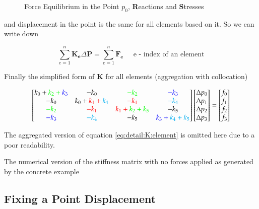 \begin{figure}[H]
\centering

\caption{Force Equilibrium in the Point $p_0$, \textbf{R}eactions and \textbf{S}tresses}
\label{fig:point0:forces}
\end{figure}

and displacement in the point is the same for all elements based on it. So we can write down

\begin{equation}
\sum\limits_{e=1}^n \mathbf{K_e} \Delta \mathbf{P} = \sum\limits_{e=1}^n \mathbf{F_e}\;\;\;\;\;\mbox{e - index of an element}
\end{equation}

Finally the simplified form of $\mathbf{K}$ for all elements (aggregation with collocation)

\begin{equation}
\begin{bmatrix}
	k_0 + \color{green}{k_2} + \color{blue}{k_3} & -k_0 & \color{green}{-k_2} & \color{blue}{-k_3} \\
	-k_0 & k_0 + \color{red}{k_1} + \color{cyan}{k_4} & \color{red}{-k_1} & \color{cyan}{-k_4} \\
	\color{green}{-k_2} & \color{red}{-k_1} & \color{red}{k_1} + \color{green}{k_2} + k_5 & -k_5 \\
	\color{blue}{-k_3} & \color{cyan}{-k_4} & -k_5 & \color{blue}{k_3} + \color{cyan}{k_4} + k_5
\end{bmatrix}
\begin{bmatrix}
	\Delta p_0 \\
	\Delta p_1 \\
	\Delta p_2 \\
	\Delta p_3
\end{bmatrix}
=
\begin{bmatrix}
	f_0 \\
	f_1 \\
	f_2 \\
	f_3
\end{bmatrix}
\end{equation}

The aggregated version of equation \ref{eq:detail:K:element} is omitted here due to a poor readability.

\bigskip

The numerical version of the stiffness matrix with no forces applied as generated by the concrete example



\subsection{Fixing a Point Displacement}

